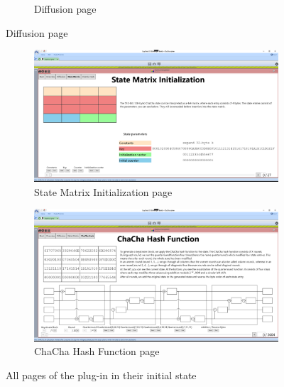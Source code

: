 \begin{enumerate}[label=(\labelenum{G}{{\arabic*}}), wide, labelwidth=!, labelindent=0pt]
\begin{figure}
\begin{subfigure}{0.85\textwidth}
  \caption{Diffusion page}
  \label{fig:all-pages.diffusion.page}
\end{subfigure}
\end{figure}
\begin{figure}
\centering
\ContinuedFloat
\begin{subfigure}{\textwidth}
  \centering
  \includegraphics[width=\textwidth]{figures/ct2/all-pages/4-statematrix.png}
  \caption{State Matrix Initialization page}
  \label{fig:all-pages.overview.page}
\end{subfigure}
\begin{subfigure}{\textwidth}
  \centering
  \includegraphics[width=\textwidth]{figures/ct2/all-pages/5-chachahash.png}
  \caption{ChaCha Hash Function page}
  \label{fig:all-pages.chachahash.page}
\end{subfigure}
\caption{All pages of the plug-in in their initial state}
\label{fig:all-pages}
\end{figure}
    

\end{enumerate}
